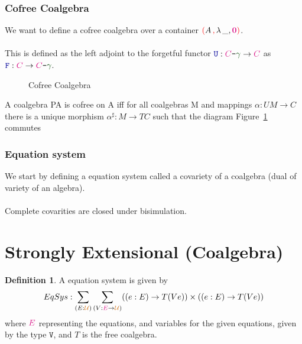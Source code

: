 \documentclass[twoside,11pt,openright]{report}
\theoremstyle{plain} %
\theoremstyle{definition}
\newtheorem{defn}{Definition}[section]
\theoremstyle{remark}
\newcommand*{\figref}[1]{Figure~\ref{fig:#1}}
\newcommand*{\term}[1]{\textcolor{green!30!black}{#1}} %
\newcommand*{\type}[1]{\textcolor{magenta!90!black}{#1}}
\newcommand*{\containerpair}[2]{\textcolor{red}{(}#1\,\textcolor{red}{,}\,#2\textcolor{red}{)}}
\newcommand*{\universe}[1]{\textcolor{orange!80!black}{#1}}
\newcommand*{\empt}{\type{\textbf{0}}}
\newcommand*{\coalg}[2]{#1\texttt{-}#2}
\newcommand*{\function}[1]{\textcolor{blue!60!black}{\ensuremath{\mathtt{#1}}}}
\newcommand*{\typeformer}[1]{\ensuremath{\mathtt{#1}}}
\newcommand*{\functor}[1]{\ensuremath{\mathbf{\mathtt{#1}}}}
\begin{document}
\subsubsection{Cofree Coalgebra}
We want to define a cofree coalgebra over a container \(\containerpair{A}{\lambda\,\_, \empt}\).
\\ \\
This is defined as the left adjoint to the forgetful functor \(\function{U} : \coalg{\type{C}}{\term{\gamma}} \rightarrow \type{C}\) as \(\function{F} : \type{C} \rightarrow \coalg{\type{C}}{\term{\gamma}}\).

\begin{figure}[h]
  \centering
  \caption{Cofree Coalgebra}
  \label{fig:cofree-coalgebra}
\end{figure}

A coalgebra PA is cofree on A iff for all coalgebras M and mappings \(\alpha : UM \rightarrow C\) there is a unique morphism \(\alpha^\sharp : M \rightarrow TC\) such that the diagram \figref{cofree-coalgebra} commutes

\subsubsection{Equation system}
We start by defining a equation system called a covariety \cite{Hughes} of a coalgebra (dual of variety of an algebra).
\\ \\
Complete covarities are closed under bisimulation.

\section{Strongly Extensional (Coalgebra)}


\begin{defn}
  A equation system is given by
  \begin{equation}
    EqSys : \sum_{(E : \universe{\mathcal{U}})} \sum_{(V : \type{E} \rightarrow \universe{\mathcal{U}})} ((e : E) \rightarrow T (V e)) \times ((e : E) \rightarrow T (V e))
  \end{equation}
  where \(\type{E}\) representing the equations, and variables for the given equations, given by the type \(\typeformer{V}\), and \(T\) is the free coalgebra.
\end{defn}
\end{document}
